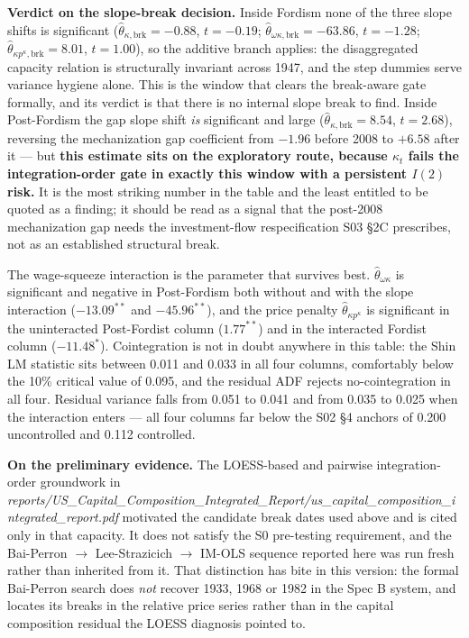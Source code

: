 \documentclass[11pt,a4paper]{article}
\begin{document}
\FloatBarrier
\textbf{Verdict on the slope-break decision.} Inside Fordism none of the three slope shifts is significant ($\hat{\theta}_{\kappa, \text{brk}} = -0.88$, $t = -0.19$; $\hat{\theta}_{\omega \kappa, \text{brk}} = -63.86$, $t = -1.28$; $\hat{\theta}_{\kappa p^{\kappa}, \text{brk}} = 8.01$, $t = 1.00$), so the additive branch applies: the disaggregated capacity relation is structurally invariant across 1947, and the step dummies serve variance hygiene alone. This is the window that clears the break-aware gate formally, and its verdict is that there is no internal slope break to find. Inside Post-Fordism the gap slope shift \textit{is} significant and large ($\hat{\theta}_{\kappa, \text{brk}} = 8.54$, $t = 2.68$), reversing the mechanization gap coefficient from $-1.96$ before 2008 to $+6.58$ after it --- but \textbf{this estimate sits on the exploratory route, because $\kappa_t$ fails the integration-order gate in exactly this window with a persistent $I(2)$ risk.} It is the most striking number in the table and the least entitled to be quoted as a finding; it should be read as a signal that the post-2008 mechanization gap needs the investment-flow respecification S03 \S2C prescribes, not as an established structural break.

The wage-squeeze interaction is the parameter that survives best. $\hat{\theta}_{\omega \kappa}$ is significant and negative in Post-Fordism both without and with the slope interaction ($-13.09^{**}$ and $-45.96^{**}$), and the price penalty $\hat{\theta}_{\kappa p^{\kappa}}$ is significant in the uninteracted Post-Fordist column ($1.77^{**}$) and in the interacted Fordist column ($-11.48^{*}$). Cointegration is not in doubt anywhere in this table: the Shin LM statistic sits between 0.011 and 0.033 in all four columns, comfortably below the 10\% critical value of 0.095, and the residual ADF rejects no-cointegration in all four. Residual variance falls from 0.051 to 0.041 and from 0.035 to 0.025 when the interaction enters --- all four columns far below the S02 \S4 anchors of 0.200 uncontrolled and 0.112 controlled.

\textbf{On the preliminary evidence.} The LOESS-based and pairwise integration-order groundwork in \textit{reports/US\_Capital\_Composition\_Integrated\_Report/us\_capital\_composition\_integrated\_report.pdf} motivated the candidate break dates used above and is cited only in that capacity. It does not satisfy the S0\* pre-testing requirement, and the Bai-Perron $\to$ Lee-Strazicich $\to$ IM-OLS sequence reported here was run fresh rather than inherited from it. That distinction has bite in this version: the formal Bai-Perron search does \textit{not} recover 1933, 1968 or 1982 in the Spec B system, and locates its breaks in the relative price series rather than in the capital composition residual the LOESS diagnosis pointed to.
\end{document}
